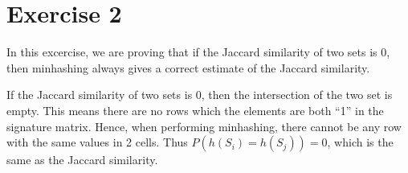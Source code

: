 \section*{Exercise 2}
In this excercise, we are proving that if the Jaccard similarity of two sets is 0, then minhashing always gives a correct estimate of the Jaccard similarity.

If the Jaccard similarity of two sets is 0, then the intersection of the two set is empty. This means there are no rows which the elements are both ``1'' in the signature matrix. Hence, when performing minhashing, there cannot be any row with the same values in 2 cells. Thus $P(h(S_i) = h(S_j)) = 0$, which is the same as the Jaccard similarity. 


